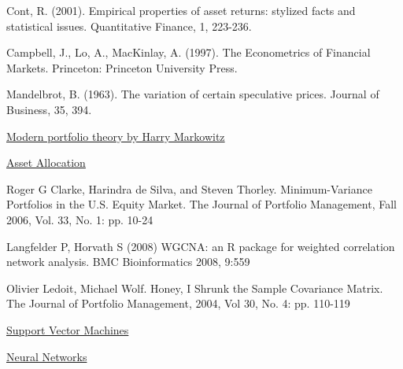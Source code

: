 \documentclass[letterpaper,12pt]{article}
\begin{document}
\begin{thebibliography}{99}

Cont, R. (2001). Empirical properties of asset returns: stylized facts and statistical issues. Quantitative Finance, 1, 223-236.

Campbell, J., Lo, A., MacKinlay, A. (1997). The Econometrics of Financial Markets. Princeton: Princeton University Press.

Mandelbrot, B. (1963). The variation of certain speculative prices. Journal of Business, 35, 394.

\href{https://en.wikipedia.org/wiki/Modern_portfolio_theory}{Modern portfolio theory by Harry Markowitz}

\href{https://en.wikipedia.org/wiki/Asset_allocation}{Asset Allocation}

Roger G Clarke, Harindra de Silva, and Steven Thorley. Minimum-Variance Portfolios in the U.S. Equity Market. The Journal of Portfolio Management,
Fall 2006, Vol. 33, No. 1: pp. 10-24

Langfelder P, Horvath S (2008) WGCNA: an R package for weighted correlation network analysis. BMC Bioinformatics 2008, 9:559

Olivier Ledoit, Michael Wolf. Honey, I Shrunk the Sample Covariance Matrix. The Journal of Portfolio Management, 2004, Vol 30, No. 4: pp. 110-119

\href{https://en.wikipedia.org/wiki/Support_vector_machine}{Support Vector Machines}

\href{https://en.wikipedia.org/wiki/Artificial_neural_network}{Neural Networks}


\end{thebibliography}
\end{document}
